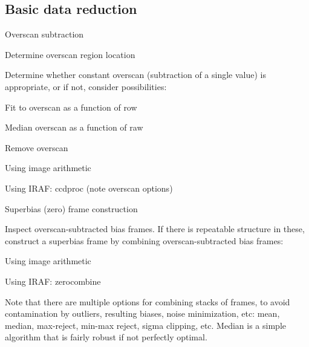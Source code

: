 \documentclass{article}
\begin{document}
\subsection*{Basic data reduction}
\begin{itemize*}
    \item Overscan subtraction
        \begin{itemize*}
            \item Determine overscan region location
            \item Determine whether constant overscan (subtraction of a single value) is
                appropriate, or if not, consider possibilities:
                \begin{itemize*}
                    \item Fit to overscan as a function of row
                    \item Median overscan as a function of raw
                \end{itemize*}
            \item Remove overscan
                \begin{itemize*}
                    \item Using image arithmetic
                    \item Using IRAF: ccdproc (note overscan options)
                \end{itemize*}
        \end{itemize*}
    \item Superbias (zero) frame construction
        \begin{itemize*}
            \item Inspect overscan-subtracted bias frames. If there is repeatable
                structure in these, construct a superbias frame by combining
                overscan-subtracted bias frames:
                \begin{itemize*}
                    \item Using image arithmetic
                    \item Using IRAF: zerocombine
                    \item Note that there are multiple options for combining stacks of frames,
                        to avoid contamination by outliers, resulting biases, noise
                        minimization, etc: mean, median, max-reject, min-max reject, sigma
                        clipping, etc. Median is a simple algorithm that is fairly robust if
                        not perfectly optimal.

\end{itemize*}
\end{itemize*}
\end{itemize*}
\end{document}
